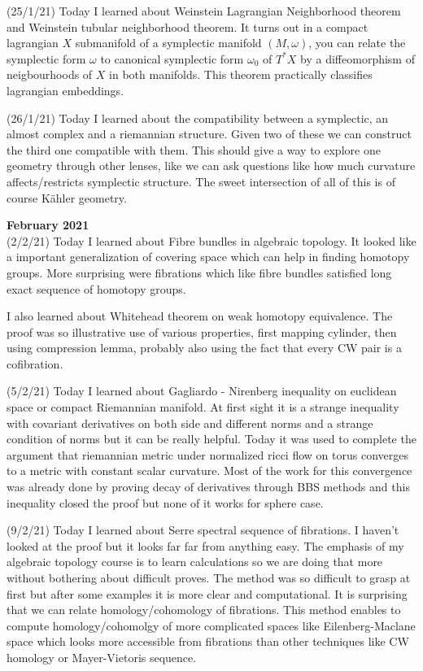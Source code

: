 \documentclass[12pt,a4paper]{article}
\begin{document}
 (25/1/21) Today I learned about Weinstein Lagrangian Neighborhood theorem and Weinstein tubular neighborhood theorem. It turns out in a compact lagrangian $X$ submanifold of a symplectic manifold $(M,\omega)$, you can relate the symplectic form $\omega$ to canonical symplectic form $\omega_0$ of $T^{*}X$ by a diffeomorphism of neigbourhoods of $X$ in both manifolds. This theorem practically classifies lagrangian embeddings.
 
 (26/1/21) Today I learned about the compatibility between a symplectic, an almost complex and a riemannian structure. Given two of these we can construct the third one compatible with them. This should give a way to explore one geometry through other lenses, like we can ask questions like how  much curvature affects/restricts symplectic structure. The sweet intersection of all of this is of course K\"{a}hler geometry.
 \\
 
 \maketitle\textbf{February 2021}
 \\

 
 (2/2/21) Today I learned about Fibre bundles in algebraic topology. It looked like a important generalization of covering space which can help in finding homotopy groups. More surprising were fibrations which like fibre bundles satisfied long exact sequence of homotopy groups.
 
 I also learned about Whitehead theorem on weak homotopy equivalence. The proof was so illustrative use of various properties, first mapping cylinder, then using compression lemma, probably also using the fact that every CW pair is a cofibration.
 
 
 (5/2/21) Today I learned about Gagliardo - Nirenberg inequality on euclidean space or compact Riemannian manifold. At first sight it is a strange inequality with covariant derivatives on both side and different norms and a strange condition of norms but it can be really helpful. Today it was used to complete the argument that riemannian metric under normalized ricci flow on torus converges to a metric with constant scalar curvature. Most of the work for this convergence was already done by proving decay of derivatives through BBS methods and this inequality closed the proof but none of it works for sphere case. 
 
 (9/2/21) Today I learned about Serre spectral sequence of fibrations. I haven't looked at the proof but it looks far far from anything easy. The emphasis of my algebraic topology course is to learn calculations so we are doing that more without bothering about difficult proves. The method was so difficult to grasp at first but after some examples it is more clear and computational. It is surprising that we can relate homology/cohomology of fibrations. This method enables to compute homology/cohomolgy of more complicated spaces like Eilenberg-Maclane space which looks more accessible from fibrations than other techniques like CW homology or Mayer-Vietoris sequence. 
 
\end{document}
